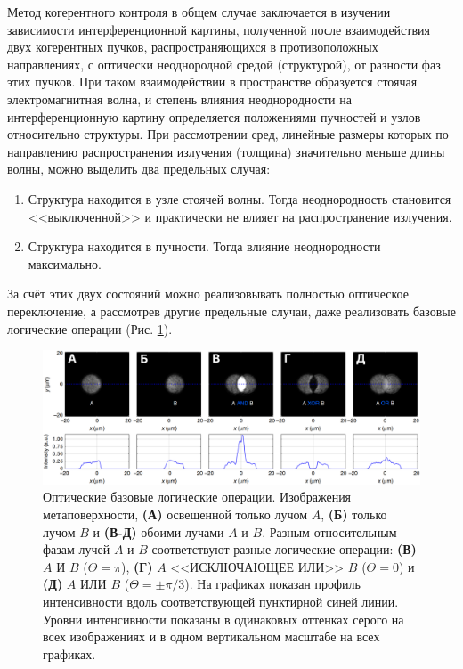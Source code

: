 Метод когерентного контроля в общем случае заключается в изучении зависимости интерференционной картины, полученной после взаимодействия двух когерентных пучков, распространяющихся в противоположных направлениях, с оптически неоднородной средой (структурой), от разности фаз этих пучков. При таком взаимодействии в пространстве образуется стоячая электромагнитная волна, и степень влияния неоднородности на интерференционную картину определяется положениями пучностей и узлов относительно структуры. При рассмотрении сред, линейные размеры которых по направлению распространения излучения (толщина) значительно меньше длины волны, можно выделить два предельных случая:
\begin{enumerate}
    \item Структура находится в узле стоячей волны. Тогда неоднородность становится <<выключенной>> и практически не влияет на распространение излучения.
    \item Структура находится в пучности. Тогда влияние неоднородности максимально.
\end{enumerate}
За счёт этих двух состояний можно реализовывать полностью оптическое переключение, а рассмотрев другие предельные случаи, даже реализовать базовые логические операции (Рис. \ref{fig:opticalLogic})\cite{twoDimensional2016}.
\begin{figure}
    \begin{center}
        \includegraphics[width=\textwidth]{pictures/Optical_logic.png}
        \caption{Оптические базовые логические операции. Изображения метаповерхности, \textbf{(А)} освещенной только лучом $A$, \textbf{(Б)} только лучом $B$ и \textbf{(В-Д)} обоими лучами $A$ и $B$. Разным относительным фазам лучей $A$ и $B$ соответствуют разные логические операции: \textbf{(В)} $A$ И $B$ ($\Theta = \pi$), \textbf{(Г)} $A$ <<ИСКЛЮЧАЮЩЕЕ ИЛИ>> $B$ ($\Theta = 0$) и \textbf{(Д)} $A$ ИЛИ $B$ ($\Theta = \pm \pi/3$). На графиках показан профиль интенсивности вдоль соответствующей пунктирной синей линии. Уровни интенсивности показаны в одинаковых оттенках серого на всех изображениях и в одном вертикальном масштабе на всех графиках.\cite[Fig. 3]{twoDimensional2016}}
    \end{center}
    \label{fig:opticalLogic}
\end{figure}

